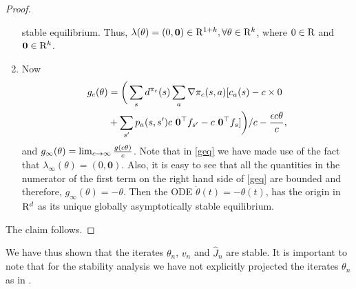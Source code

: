 \begin{proof}
\begin{enumerate}
stable equilibrium. Thus, $\lambda(\theta)=(0,\mathbf{0}) \in \mathrm{R}^{1+k}, \forall \theta \in \mathrm{R}^k$, where 
$0 \in \mathrm{R}$ and $\mathbf{0}\in \mathrm{R}^k$.
\item Now 
\begin{align}\label{geq}
g_c(\theta)&=\bigg(\sum_s d^{\pi_c}(s)\sum_a \nabla \pi_c(s,a)[c_a(s)-c \times 0\nonumber\\&+\sum_{s'}p_a(s,s') c \mbox{ } \mathbf{0}^\top f_{s'}-c \mbox{ }\mathbf{0}^\top f_s]\bigg)/{c}-\frac{\epsilon c\theta}{c},
\end{align}
and $g_\infty(\theta)=\lim_{c \rightarrow \infty}\frac{g(c\theta)}{c}$. Note that in \eqref{geq} we have made use of 
the fact that $\lambda_\infty(\theta)=(0,\mathbf{0})$. Also, it is easy to see that all the quantities in 
the numerator of the first term on the right hand side of \eqref{geq} are bounded and therefore,
$g_\infty(\theta)=-\theta$. Then the ODE $\dot{\theta}(t)=-\theta(t)$, has the origin in $\mathrm{R}^d$ as its 
unique globally asymptotically stable equilibrium.
\end{enumerate}
The claim follows. \end{proof}

We have thus shown that the iterates $\theta_n$, $v_n$ and $\hat{J}_n$ are stable. It is important to note 
that for the stability analysis we have not explicitly projected the iterates $\theta_n$ as in \cite{NAC}.


